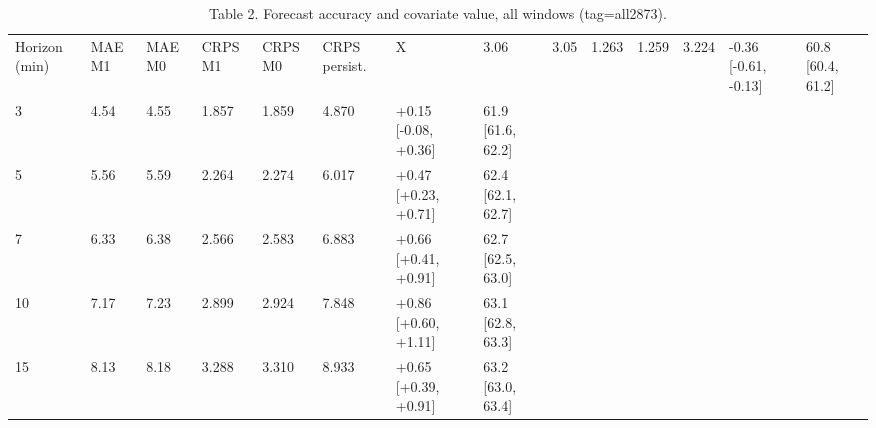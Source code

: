 \begin{table}[t]\centering\footnotesize
\caption{Table 2. Forecast accuracy and covariate value, all windows (tag=all2873).}
\begin{tabular}{llllllll}
\toprule
Horizon (min) & MAE M1 & MAE M0 & CRPS M1 & CRPS M0 & CRPS persist. & X%
 & 3.06 & 3.05 & 1.263 & 1.259 & 3.224 & -0.36 [-0.61, -0.13] & 60.8 [60.4, 61.2] \\
3 & 4.54 & 4.55 & 1.857 & 1.859 & 4.870 & +0.15 [-0.08, +0.36] & 61.9 [61.6, 62.2] \\
5 & 5.56 & 5.59 & 2.264 & 2.274 & 6.017 & +0.47 [+0.23, +0.71] & 62.4 [62.1, 62.7] \\
7 & 6.33 & 6.38 & 2.566 & 2.583 & 6.883 & +0.66 [+0.41, +0.91] & 62.7 [62.5, 63.0] \\
10 & 7.17 & 7.23 & 2.899 & 2.924 & 7.848 & +0.86 [+0.60, +1.11] & 63.1 [62.8, 63.3] \\
15 & 8.13 & 8.18 & 3.288 & 3.310 & 8.933 & +0.65 [+0.39, +0.91] & 63.2 [63.0, 63.4] \\
\bottomrule
\end{tabular}
\end{table}
